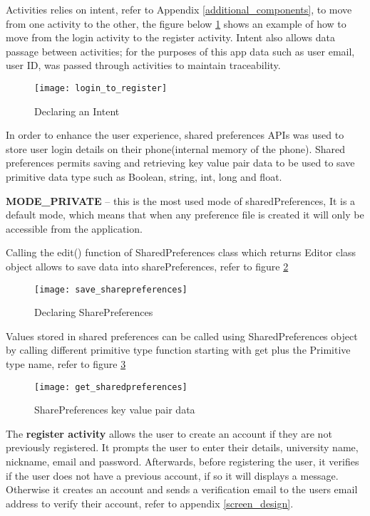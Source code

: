 Activities relies on intent, refer to Appendix \ref{additional_components}, to move from one activity to the other, the figure below \ref{fig:intent} shows an example of how to move from the login activity to the register activity. Intent also allows data passage between activities; for the purposes of this app data such as user email, user ID, was passed through activities to maintain traceability.
\begin{figure}[h!]
	\centering       
	\texttt{[image: login\_to\_register]}
	\caption{Declaring an Intent}
	\label{fig:intent}	
\end{figure}
In order to enhance the user experience, shared preferences APIs was used to store user login details on their phone(internal memory of the phone). Shared preferences permits saving and retrieving key value pair data to be used to save primitive data type such as Boolean, string, int, long and float.

\textbf{MODE\_PRIVATE} – this is the most used mode of sharedPreferences, It is a default mode, which means that when any preference file is created it will only be accessible from the application.

Calling the edit() function of SharedPreferences class which returns Editor class object allows to save data into sharePreferences, refer to figure \ref{fig:save_share_preferences}

\begin{figure}[h!]
	\centering       
	\texttt{[image: save\_sharepreferences]}
	\caption{Declaring SharePreferences}
	\label{fig:save_share_preferences}	
\end{figure}

Values stored in shared preferences can be called using SharedPreferences object by calling different primitive type function starting with get plus the Primitive type name, refer to figure \ref{fig:get_share_preferences}
\begin{figure}[h!]
	\centering       
	\texttt{[image: get\_sharedpreferences]}
	\caption{SharePreferences key value pair data}
	\label{fig:get_share_preferences}	
\end{figure} 
 
 The \textbf{register activity}  allows the user to create an account if they are not previously registered. It prompts the user to enter their details, university name, nickname, email and password. Afterwards, before registering the user, it verifies if the user does not have a previous account, if so it will displays a message. Otherwise it creates an account and sends a verification email to the users email address to verify their account, refer to appendix \ref{screen_design}.
 
